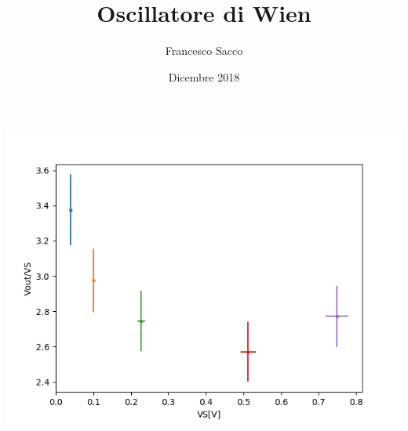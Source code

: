\documentclass{article}
\date{Dicembre 2018}
\author{Francesco Sacco}
\title{Oscillatore di Wien}
\begin{document}
    \begin{minipage}{.4\linewidth}
        \centering
        \includegraphics[width=\linewidth]{figure/1b.png}
    \end{minipage}
    \begin{minipage}{.5\linewidth}
        
        \label{tab:124}
    \end{minipage}
\end{document}
